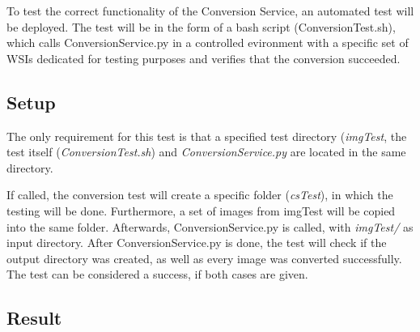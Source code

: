 To test the correct functionality of the Conversion Service, an automated test will be deployed. The test will be in the form of a bash script (ConversionTest.sh), which calls ConversionService.py in a controlled evironment with a specific set of WSIs dedicated for testing purposes and verifies that the conversion succeeded.


\subsection{Setup}

The only requirement for this test is that a specified test directory (\emph{imgTest}, the test itself (\emph{ConversionTest.sh}) and \emph{ConversionService.py} are located in the same directory. 

If called, the conversion test will create a specific folder (\emph{csTest}), in which the testing will be done. Furthermore, a set of images from imgTest will be copied into the same folder. Afterwards, ConversionService.py is called, with \emph{imgTest/} as input directory. After ConversionService.py is done, the test will check if the output directory was created, as well as every image was converted successfully. The test can be considered a success, if both cases are given.


\subsection{Result}
